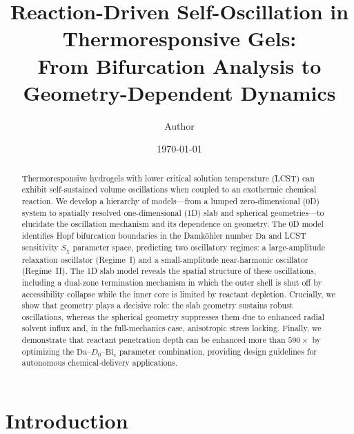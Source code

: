 \documentclass[aps,pre,reprint,superscriptaddress,longbibliography,floatfix]{revtex4-2}
\newcommand{\Da}{\mathrm{Da}}
\newcommand{\Bi}{\mathrm{Bi}}
\begin{document}
\title{Reaction-Driven Self-Oscillation in Thermoresponsive Gels: \\
From Bifurcation Analysis to Geometry-Dependent Dynamics}

\author{Author}

\date{\today}

\begin{abstract}
Thermoresponsive hydrogels with lower critical solution temperature (LCST)
can exhibit self-sustained volume oscillations when coupled to an
exothermic chemical reaction. We develop a hierarchy of models---from a
lumped zero-dimensional (0D) system to spatially resolved one-dimensional
(1D) slab and spherical geometries---to elucidate the oscillation
mechanism and its dependence on geometry. The 0D model identifies Hopf
bifurcation boundaries in the Damk\"ohler number $\Da$ and LCST
sensitivity $S_\chi$ parameter space, predicting two oscillatory
regimes: a large-amplitude relaxation oscillator (Regime~I) and a
small-amplitude near-harmonic oscillator (Regime~II). The 1D slab model
reveals the spatial structure of these oscillations, including a
dual-zone termination mechanism in which the outer shell is shut off by
accessibility collapse while the inner core is limited by reactant
depletion. Crucially, we show that geometry plays a decisive role:
the slab geometry sustains robust oscillations, whereas the spherical
geometry suppresses them due to enhanced radial solvent influx and, in
the full-mechanics case, anisotropic stress locking. Finally, we
demonstrate that reactant penetration depth can be enhanced more than
$590\times$ by optimizing the $\Da$--$D_0$--$\Bi_c$ parameter
combination, providing design guidelines for autonomous
chemical-delivery applications.
\end{abstract}

\maketitle

\section{Introduction}
\label{sec:intro}
\end{document}

